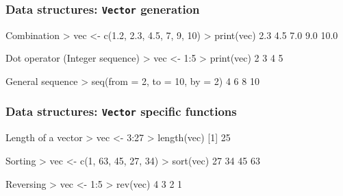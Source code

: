 \documentclass[ucs]{beamer}
\begin{document}
\begin{frame}
        \frametitle{Data structures: \texttt{Vector} generation}
    \begin{block}{Combination}
\ttfamily > vec <- c(1.2, 2.3, 4.5, 7, 9, 10)\newline
> print(vec)   2.3  4.5  7.0  9.0 10.0
     \end{block}

     \begin{block}{Dot operator (Integer sequence)}
\ttfamily > vec <- 1:5 \newline
> print(vec)  2 3 4 5
     \end{block}
   
     \begin{block}{General sequence}
\ttfamily >  seq(from = 2,  to = 10, by = 2) 4 6 8 10
     \end{block}
   
  \end{frame}

\begin{frame}
  \frametitle{Data structures: \texttt{Vector} specific functions}
  \begin{block}{Length of a vector}
    \ttfamily
    > vec <- 3:27 \newline
    > length(vec)
    [1] 25
  \end{block}
  
  \begin{block}{Sorting}
    \ttfamily > vec <- c(1, 63, 45, 27, 34)\newline
    > sort(vec) 27 34 45 63
  \end{block}
  
  \begin{block}{Reversing}
    \ttfamily > vec <- 1:5\newline
    > rev(vec) 4 3 2 1
  \end{block}
  
  
\end{frame}
\end{document}
